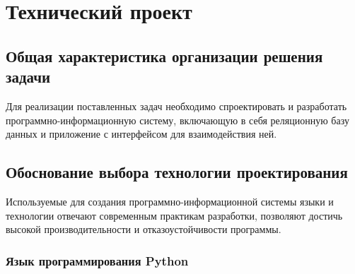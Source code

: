 \section{Технический проект}
\subsection{Общая характеристика организации решения задачи}

Для реализации поставленных задач необходимо спроектировать и разработать программно-информационную систему, включающую в себя реляционную базу данных и приложение с интерфейсом для взаимодействия ней.

\subsection{Обоснование выбора технологии проектирования}

Используемые для создания программно-информационной системы языки и технологии отвечают современным практикам разработки, позволяют достичь высокой производительности и отказоустойчивости программы.

\subsubsection{Язык программирования Python}

